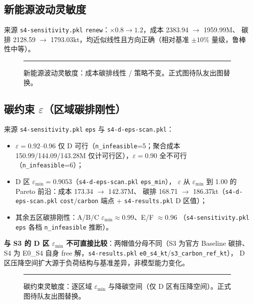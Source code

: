 \documentclass{internal-report}
\begin{document}
\subsection{新能源波动灵敏度}
\label{sec:sens-renew}

来源 \texttt{s4-sensitivity.pkl} \texttt{renew}：$\times 0.8 \to 1.2$，成本 2383.94 $\to$ 1959.99M、
碳排 2128.59 $\to$ 1793.03kt，均近似线性且方向正确（相对基准 $\pm 10\%$ 量级，鲁棒性中等）。

\begin{figure}[H]
\centering
\rule{0.9\textwidth}{4cm}
\caption{新能源波动灵敏度：成本碳排线性 / 策略不变。正式图待队友出图替换。}
\label{fig:sensr}
\end{figure}

\subsection{碳约束 $\varepsilon$（区域碳排刚性）}
\label{sec:sens-eps}

来源 \texttt{s4-sensitivity.pkl} \texttt{eps} 与 \texttt{s4-d-eps-scan.pkl}：
\begin{itemize}
  \item $\varepsilon{=}0.92$--0.96 仅 D 可行（\texttt{n\_infeasible}=5；聚合成本 150.99/144.09/143.28M
        仅计可行区），$\varepsilon{=}0.90$ 全不可行（\texttt{n\_infeasible}=6）；
  \item D 区 $\varepsilon_{\min}=0.9053$（\texttt{s4-d-eps-scan.pkl} \texttt{eps\_min}），
        $\varepsilon$ 从 $\varepsilon_{\min}$ 到 1.00 的 Pareto 前沿：成本 173.34 $\to$ 142.37M、
        碳排 168.71 $\to$ 186.37kt（\texttt{s4-d-eps-scan.pkl} \texttt{cost}/\texttt{carbon}
        端点 + \texttt{s4-results.pkl} D 区值）；
  \item 其余五区碳排刚性：A/B/C $\varepsilon_{\min}\approx 0.99$、E/F $\approx 0.96$
        （\texttt{s4-sensitivity.pkl} \texttt{eps} 各档 \texttt{n\_infeasible} 推断）。
\end{itemize}

\textbf{与 S3 的 D 区 $\varepsilon_{\min}$ 不可直接比较}：两帽值分母不同（S3 为官方 Baseline 碳排、
S4 为 E0\_S4 自身 free 解，\texttt{s4-results.pkl} \texttt{e0\_s4\_kt}/\texttt{s3\_carbon\_ref\_kt}），
D 区压降空间扩大源于负荷结构与基准差异，非模型能力变化。

\begin{figure}[H]
\centering
\rule{0.85\textwidth}{4cm}
\caption{碳约束灵敏度：逐区域 $\varepsilon_{\min}$ 与降碳空间（仅 D 区有压降空间）。正式图待队友出图替换。}
\label{fig:pareto}
\end{figure}
\end{document}
